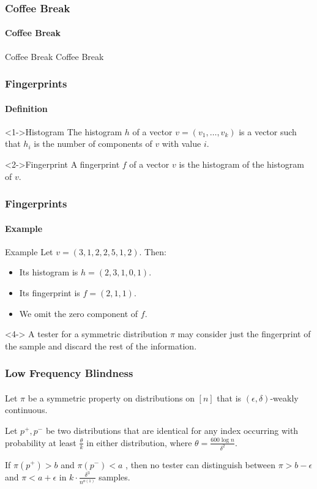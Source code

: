 \documentclass[handout]{beamer}
\begin{document}
\begin{frame}
  \frametitle{Coffee Break}
  \framesubtitle{Coffee Break}
  \begin{block}{Coffee Break}
    Coffee Break
  \end{block}
\end{frame}

\begin{frame}
  \frametitle{Fingerprints} \framesubtitle{Definition}

  \begin{block}<1->{Histogram}
    The histogram $h$ of a vector $v=(v_1,\ldots,v_k)$ is a vector such
    that $h_i$ is the number of components of $v$ with value $i$.
  \end{block}
  \begin{block}<2->{Fingerprint}
    A fingerprint $f$ of a vector $v$ is the histogram of the
    histogram of $v$.
  \end{block}
\end{frame}

\begin{frame}
  \frametitle{Fingerprints} \framesubtitle{Example}

  \begin{block}{Example}
    Let $v=(3,1,2,2,5,1,2)$. Then:
    \begin{itemize}
    \item<1-> Its histogram is $h=(2,3,1,0,1)$.
    \item<2-> Its fingerprint is $f=(2,1,1)$.
    \item<3-> We omit the zero component of $f$.
    \end{itemize}
  \end{block}
  \begin{block}<4->{} A tester for a symmetric distribution $\pi$ may
    consider just the fingerprint of the sample and discard the rest
    of the information.
  \end{block}
\end{frame}


\begin{frame}
  \frametitle{Low Frequency Blindness} \framesubtitle{}
  \begin{theorem}
    Let $\pi$ be a symmetric property on distributions on $[n]$ that
    is $(\epsilon,\delta)$-weakly continuous.

    Let $p^+,p^-$ be two distributions that are identical for any
    index occurring with probability at least $\frac{\theta}{k}$ in
    either distribution, where $\theta=\frac{600\log n}{\delta^2}$.

    If $\pi(p^+)>b$ and $\pi(p^-)<a$ , then no tester can distinguish
    between $\pi>b-\epsilon$ and $\pi<a+\epsilon$ in $k\cdot
    \frac{\delta^3}{n^{o(1)}}$ samples.
  \end{theorem}
\end{frame}
\end{document}
